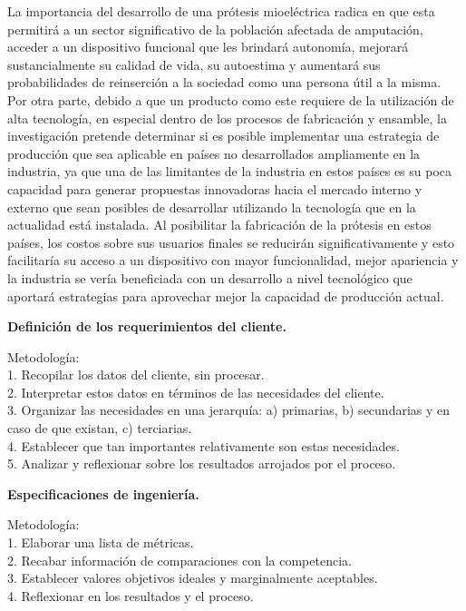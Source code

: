\documentclass{article}
\begin{document}
La importancia del desarrollo de una prótesis mioeléctrica radica en que esta permitirá a un sector significativo de la población afectada de amputación, acceder a un dispositivo funcional que les brindará autonomía, mejorará sustancialmente su calidad de vida, su autoestima y aumentará sus probabilidades de reinserción a la sociedad como una persona útil a la misma.
Por otra parte, debido a que un producto como este requiere de la utilización de alta tecnología, en especial dentro de los procesos de fabricación y ensamble, la investigación pretende determinar si es posible implementar una estrategia de producción que sea aplicable en países no desarrollados ampliamente en la industria, ya que una de las limitantes de la industria en estos países es su poca capacidad para generar propuestas innovadoras hacia el mercado interno y externo que sean posibles de desarrollar utilizando la tecnología que en la actualidad está instalada. Al posibilitar la fabricación de la prótesis en estos países, los costos sobre sus usuarios finales se reducirán significativamente y esto facilitaría su acceso a un dispositivo con mayor funcionalidad, mejor apariencia y la industria se vería beneficiada con un desarrollo a nivel tecnológico que aportará estrategias para aprovechar mejor la capacidad de producción actual\cite{ff5}.


\textbf{Definición de los requerimientos del cliente.} 


Metodología:
\\1. Recopilar los datos del cliente, sin procesar.
\\2. Interpretar estos datos en términos de las necesidades del cliente.
\\3. Organizar las necesidades en una jerarquía: a) primarias, b) secundarias y en caso de
que existan, c) terciarias.
\\4. Establecer que tan importantes relativamente son estas necesidades. 
\\5. Analizar y reflexionar sobre los resultados arrojados por el proceso\cite{ff5}.


\textbf{Especificaciones de ingeniería.} 


Metodología:
\\1. Elaborar una lista de métricas.
\\2. Recabar información de comparaciones con la competencia.
\\3. Establecer valores objetivos ideales y marginalmente aceptables.
\\4. Reflexionar en los resultados y el proceso\cite{ff5}.
\end{document}
